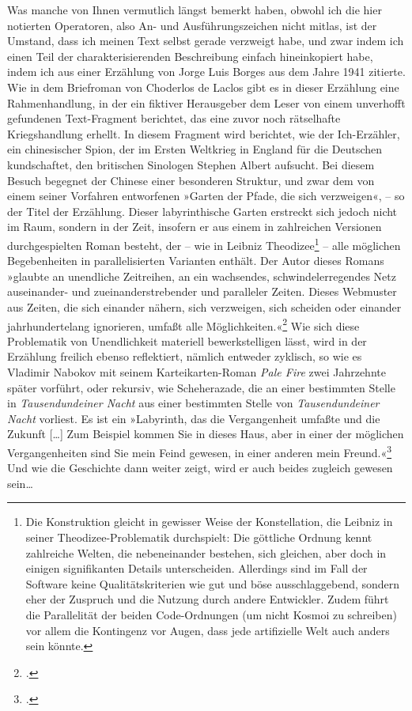 \documentclass[a4paper,12pt]{article}
\newcommand{\anf}[1]{»#1«}
\begin{document}
Was manche von Ihnen vermutlich längst bemerkt haben, obwohl ich die hier notierten Operatoren, also An- und Ausführungszeichen nicht mitlas, ist der Umstand, dass ich meinen Text selbst gerade verzweigt habe, und zwar indem ich einen Teil der charakterisierenden Beschreibung einfach hineinkopiert habe, indem ich aus einer Erzählung von Jorge Luis Borges aus dem Jahre 1941 zitierte. Wie in dem Briefroman von Choderlos de Laclos gibt es in dieser Erzählung eine Rahmenhandlung, in der ein fiktiver Herausgeber dem Leser von einem unverhofft gefundenen Text-Fragment berichtet, das eine zuvor noch rätselhafte Kriegshandlung erhellt. In diesem Fragment wird berichtet, wie der Ich-Erzähler, ein chinesischer Spion, der im Ersten Weltkrieg in England für die Deutschen kundschaftet, den britischen Sinologen Stephen Albert aufsucht. Bei diesem Besuch begegnet der Chinese einer besonderen Struktur, und zwar dem von einem seiner Vorfahren entworfenen \anf{Garten der Pfade, die sich verzweigen}, – so der Titel der Erzählung. Dieser labyrinthische Garten erstreckt sich jedoch nicht im Raum, sondern in der Zeit, insofern er aus einem in zahlreichen Versionen durchgespielten Roman besteht, der – wie in Leibniz Theodizee\footnote{Die Konstruktion gleicht in gewisser Weise der Konstellation, die Leibniz in seiner Theodizee-Problematik durchspielt: Die göttliche Ordnung kennt zahlreiche Welten, die nebeneinander bestehen, sich gleichen, aber doch in einigen signifikanten Details unterscheiden. Allerdings sind im Fall der Software keine Qualitätskriterien wie gut und böse ausschlaggebend, sondern eher der Zuspruch und die Nutzung durch andere Entwickler. Zudem führt die Parallelität der beiden Code-Ordnungen (um nicht Kosmoi zu schreiben) vor allem die Kontingenz vor Augen, dass jede artifizielle Welt auch anders sein könnte.} – alle möglichen Begebenheiten in parallelisierten Varianten enthält. Der Autor dieses Romans \anf{glaubte an unendliche Zeitreihen, an ein wachsendes, schwindelerregendes Netz auseinander- und zueinanderstrebender und paralleler Zeiten. Dieses Webmuster aus Zeiten, die sich einander nähern, sich verzweigen, sich scheiden oder einander jahrhundertelang ignorieren, umfaßt alle Möglichkeiten.}\footcite[172]{borges:1941} Wie sich diese Problematik von Unendlichkeit materiell bewerkstelligen lässt, wird in der Erzählung freilich ebenso reflektiert, nämlich entweder zyklisch, so wie es Vladimir Nabokov mit seinem Karteikarten-Roman \emph{Pale Fire} zwei Jahrzehnte später vorführt, oder rekursiv, wie Scheherazade, die an einer bestimmten Stelle in \emph{Tausendundeiner Nacht} aus einer bestimmten Stelle von \emph{Tausendundeiner Nacht} vorliest. Es ist ein \anf{Labyrinth, das die Vergangenheit umfaßte und die Zukunft [\ldots] Zum Beispiel kommen Sie in dieses Haus, aber in einer der möglichen Vergangenheiten sind Sie mein Feind gewesen, in einer anderen mein Freund.}\footcite[166/170]{borges:1941} Und wie die Geschichte dann weiter zeigt, wird er auch beides zugleich gewesen sein\ldots %
\end{document}
